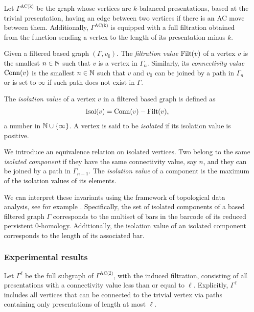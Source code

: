 Let $\Gamma^{\text{AC(k)}}$ be the graph whose vertices are $k$-balanced presentations, based at the trivial presentation, having an edge between two vertices if there is an AC move between them.
Additionally, $\Gamma^{\text{AC(k)}}$ is equipped with a full filtration obtained from the function sending a vertex to the length of its presentation minus $k$.


Given a filtered based graph $(\Gamma, v_0)$.
The \textit{filtration value} $\operatorname{Filt}(v)$ of a vertex $v$ is the smallest $n \in \mathbb{N}$ such that $v$ is a vertex in $\Gamma_n$.
Similarly, its \textit{connectivity value} $\operatorname{Conn}(v)$ is the smallest $n \in \mathbb{N}$ such that $v$ and $v_0$ can be joined by a path in $\Gamma_n$ or is set to $\infty$ if such path does not exist in $\Gamma$.

The \textit{isolation value} of a vertex $v$ in a filtered based graph is defined as
\[
\operatorname{Isol}(v) = \operatorname{Conn}(v) - \operatorname{Filt}(v),
\]
a number in $\mathbb{N} \cup \{\infty\}$.
A vertex is said to be \textit{isolated} if its isolation value is positive.

We introduce an equivalence relation on isolated vertices.
Two belong to the same \textit{isolated component} if they have the same connectivity value, say $n$, and they can be joined by a path in $\Gamma_{n-1}$.
The \textit{isolation value} of a component is the maximum of the isolation values of its elements.

We can interpret these invariants using the framework of topological data analysis, see for example \cite{carlsson2022tda}.
Specifically, the set of isolated components of a based filtered graph $\Gamma$ corresponds to the multiset of bars in the barcode of its reduced persistent $0$-homology.
Additionally, the isolation value of an isolated component corresponds to the length of its associated bar.

\subsubsection{Experimental results}

Let \(\Gamma^\ell\) be the full subgraph of \(\Gamma^{\text{AC(2)}}\), with the induced filtration, consisting of all presentations with a connectivity value less than or equal to \(\ell\).
Explicitly, \(\Gamma^\ell\) includes all vertices that can be connected to the trivial vertex via paths containing only presentations of length at most \(\ell\).

